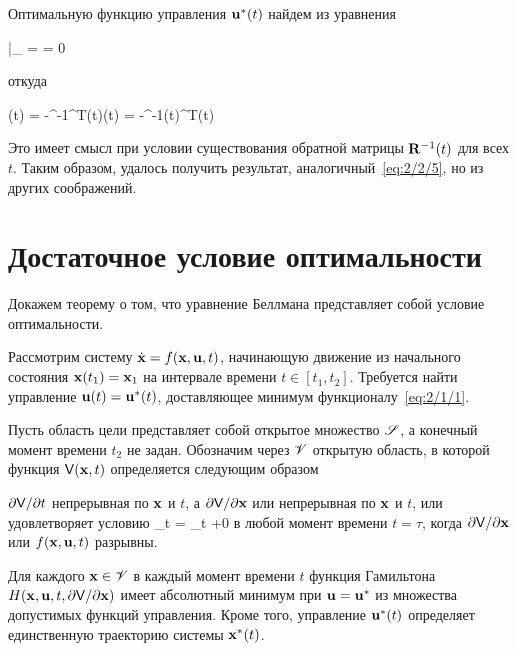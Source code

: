 Оптимальную функцию управления ${\mathbf{u}^{*}}(t)$ найдем из уравнения

\beqn
	\biggm|_{ = \optU} = 0 \text{,}
\eeqn

откуда

    \optU(t) = -^{-1}^T(t)\m{\psi}(t) = -^{-1}(t)^T(t) 
\eeq

Это имеет смысл при условии существования обратной матрицы $\mathbf{R}^{-1}(t)$ для всех $t$. Таким образом, удалось получить результат, аналогичный~\vref{eq:2/2/5}, но из других соображений.



\section{Достаточное условие оптимальности}



Докажем теорему о том, что уравнение Беллмана представляет собой условие оптимальности\cite{TCHAMRAN}.

	Рассмотрим систему $\dot{\mathbf{x}} = f(\mathbf{x}, \mathbf{u}, t)$, начинающую движение из начального состояния $\mathbf{x}(t_1) = \mathbf{x}_1$ на интервале времени $t \in [t_1, t_2]$. Требуется найти управление $\mathbf{u}(t) = {\mathbf{u}^{*}}(t)$, доставляющее минимум функционалу~\vref{eq:2/1/1}.
	
	Пусть область цели представляет собой открытое множество $\mathscr{S}$, а конечный момент времени $t_2$ не задан. Обозначим через $\mathscr{V}$ открытую область, в которой функция $\mathsf{V}(\mathbf{x}, t)$ определяется следующим образом
	
	\benum
		\item
			$\partial {  \mathsf{V}  } / \partial {t}$ непрерывная по $\mathbf{x}$ и $t$, а $\partial {  \mathsf{V}  } / \partial {  \mathbf{x}  }$ или непрерывная по $\mathbf{x}$ и $t$, или удовлетворяет условию
    			\lim\limits_{t \to {}}  = \lim\limits_{t \to \tau+0} 
			\eeq
			в любой момент времени $t = \tau$, когда $\partial {  \mathsf{V}  } / \partial {  \mathbf{x}  }$ или $f(\mathbf{x}, \mathbf{u}, t)$ разрывны.
			
		\item
			Для каждого $\mathbf{x} \in \mathscr{V}$ в каждый момент времени $t$ функция Гамильтона $H(\mathbf{x}, \mathbf{u}, t, \partial {  \mathsf{V}  } / \partial {  \mathbf{x}  })$ имеет абсолютный минимум при $\mathbf{u} = {\mathbf{u}^{*}}$ из множества допустимых функций управления. Кроме того, управление ${\mathbf{u}^{*}}(t)$ определяет единственную траекторию системы ${\mathbf{x}^{*}}(t)$.
			
